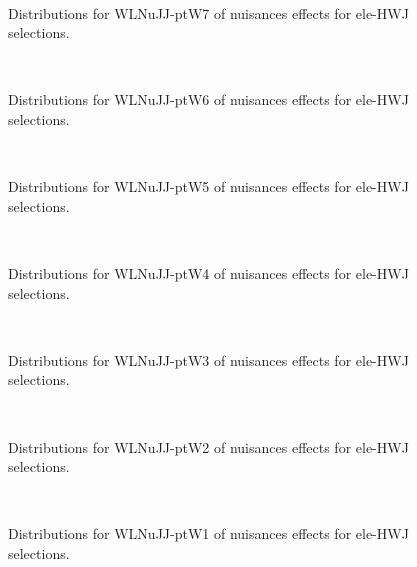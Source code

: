 \begin{figure}[htbp]  
\centering 
\\ 
\caption{ 
   Distributions for WLNuJJ-ptW7 of nuisances effects for ele-HWJ selections.
} 
\label{fig:WLNuJJ_ptW7_ele_HWJ} 
\end{figure} 




\begin{figure}[htbp]  
\centering 
\\ 
\caption{ 
   Distributions for WLNuJJ-ptW6 of nuisances effects for ele-HWJ selections.
} 
\label{fig:WLNuJJ_ptW6_ele_HWJ} 
\end{figure} 




\begin{figure}[htbp]  
\centering 
\\ 
\caption{ 
   Distributions for WLNuJJ-ptW5 of nuisances effects for ele-HWJ selections.
} 
\label{fig:WLNuJJ_ptW5_ele_HWJ} 
\end{figure} 




\begin{figure}[htbp]  
\centering 
\\ 
\caption{ 
   Distributions for WLNuJJ-ptW4 of nuisances effects for ele-HWJ selections.
} 
\label{fig:WLNuJJ_ptW4_ele_HWJ} 
\end{figure} 




\begin{figure}[htbp]  
\centering 
\\ 
\caption{ 
   Distributions for WLNuJJ-ptW3 of nuisances effects for ele-HWJ selections.
} 
\label{fig:WLNuJJ_ptW3_ele_HWJ} 
\end{figure} 




\begin{figure}[htbp]  
\centering 
\\ 
\caption{ 
   Distributions for WLNuJJ-ptW2 of nuisances effects for ele-HWJ selections.
} 
\label{fig:WLNuJJ_ptW2_ele_HWJ} 
\end{figure} 




\begin{figure}[htbp]  
\centering 
\\ 
\caption{ 
   Distributions for WLNuJJ-ptW1 of nuisances effects for ele-HWJ selections.
} 
\label{fig:WLNuJJ_ptW1_ele_HWJ} 
\end{figure} 




